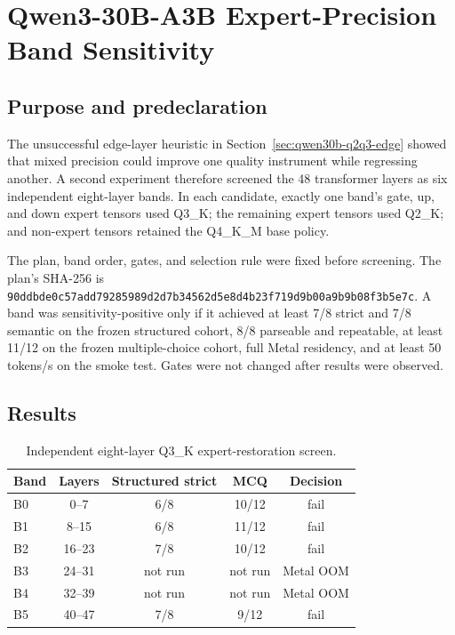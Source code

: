 \section{Qwen3-30B-A3B Expert-Precision Band Sensitivity}
\label{sec:qwen30b-band-sensitivity}

\subsection{Purpose and predeclaration}

The unsuccessful edge-layer heuristic in
Section~\ref{sec:qwen30b-q2q3-edge} showed that mixed precision could improve
one quality instrument while regressing another.  A second experiment therefore
screened the 48 transformer layers as six independent eight-layer bands.  In
each candidate, exactly one band's gate, up, and down expert tensors used
Q3\_K; the remaining expert tensors used Q2\_K; and non-expert tensors retained
the Q4\_K\_M base policy.

The plan, band order, gates, and selection rule were fixed before screening.
The plan's SHA-256 is
\texttt{90ddbde0c57add79285989d2d7b34562d5e8d4b23f719d9b00a9b9b08f3b5e7c}.
A band was sensitivity-positive only if it achieved at least 7/8 strict and
7/8 semantic on the frozen structured cohort, 8/8 parseable and repeatable,
at least 11/12 on the frozen multiple-choice cohort, full Metal residency, and
at least 50 tokens/s on the smoke test.  Gates were not changed after results
were observed.

\subsection{Results}

\begin{table}[ht]
\centering
\small
\begin{tabular}{lcccc}
\toprule
Band & Layers & Structured strict & MCQ & Decision \\
\midrule
B0 & 0--7   & 6/8 & 10/12 & fail \\
B1 & 8--15  & 6/8 & 11/12 & fail \\
B2 & 16--23 & 7/8 & 10/12 & fail \\
B3 & 24--31 & not run & not run & Metal OOM \\
B4 & 32--39 & not run & not run & Metal OOM \\
B5 & 40--47 & 7/8 & 9/12  & fail \\
\bottomrule
\end{tabular}
\caption{Independent eight-layer Q3\_K expert-restoration screen.}
\end{table}

